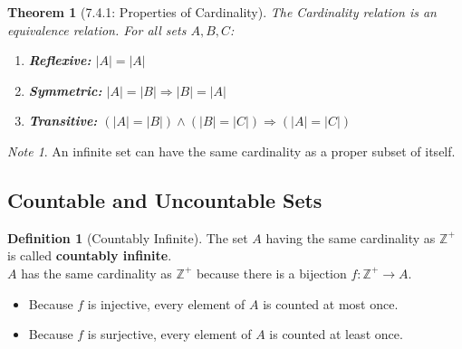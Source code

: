 \documentclass{article}
\theoremstyle{plain}
\newtheorem{theorem}{Theorem}[section]
\theoremstyle{definition}
\newtheorem*{definition}{Definition}
\theoremstyle{remark}
\newtheorem*{note}{Note}
\begin{document}
\begin{theorem}[7.4.1: Properties of Cardinality]
    The Cardinality relation is an equivalence relation. For all sets $A, B, C$:
    \begin{enumerate}[label=\alph*.]
        \item \textbf{Reflexive:} $|A| = |A|$
        \item \textbf{Symmetric:} $|A| = |B| \Rightarrow |B| = |A|$
        \item \textbf{Transitive:} $(|A| = |B|) \wedge (|B| = |C|) \Rightarrow (|A| = |C|)$
    \end{enumerate}
\end{theorem}

\begin{note}
    An infinite set can have the same cardinality as a proper subset of itself.
\end{note}

\subsection{Countable and Uncountable Sets}

\begin{definition}[Countably Infinite]
    The set $A$ having the same cardinality as $\mathbb{Z}^+$ is called \textbf{countably infinite}. \\
    $A$ has the same cardinality as $\mathbb{Z}^+$ because there is a bijection $f: \mathbb{Z}^+ \rightarrow A$.
    \begin{itemize}
        \item Because $f$ is injective, every element of $A$ is counted at most once.
        \item Because $f$ is surjective, every element of $A$ is counted at least once.
    \end{itemize}
\end{definition}
\end{document}
